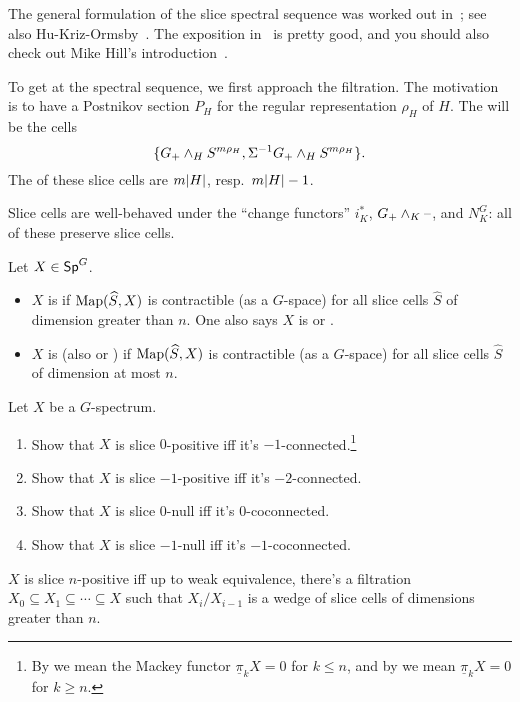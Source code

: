 The general formulation of the slice spectral sequence was worked out in~\cite{HHR}; see also
Hu-Kriz-Ormsby~\cite{HKO11}. The exposition in~\cite{HHR} is pretty good, and you should also check out Mike Hill's
introduction~\cite{HillSlice}.

To get at the spectral sequence, we first approach the filtration. The motivation is to have a Postnikov section
$P_H$ for the regular representation $\rho_H$ of $H$. The  will be the cells
\[\{G_+\wedge_H S^{m\rho_H}, \Sigma^{-1}G_+\wedge_H S^{m\rho_H}\}.\]
The  of these slice cells are $m\lvert H\rvert$, resp.\ $m\lvert H\rvert - 1$.

Slice cells are well-behaved under the ``change functors'' $i_K^*$, $G_+\wedge_K\text{--}$, and $N_K^G$: all of these
preserve slice cells.
\begin{defn}
Let $X\in\mathsf{Sp}^G$.
\begin{itemize}
	\item $X$ is  if $\operatorname{Map}(\widehat S, X)$ is contractible (as a $G$-space) for all slice
	cells $\widehat S$ of dimension greater than $n$. One also says $X$ is  or
	.
	\item $X$ is  (also  or ) if $\operatorname{Map}(\widehat S,
	X)$ is contractible (as a $G$-space) for all slice cells $\widehat S$ of dimension at most $n$.
\end{itemize}
\end{defn}
\begin{ex}
Let $X$ be a $G$-spectrum.
\label{slicerecognition}
\begin{enumerate}
	\item Show that $X$ is slice $0$-positive iff it's $-1$-connected.\footnote{By  we mean
	the Mackey functor $\underline\pi_kX = 0$ for $k\le n$, and by  we mean
	$\underline\pi_kX = 0$ for $k\ge n$.}
	\item Show that $X$ is slice $-1$-positive iff it's $-2$-connected.
	\item Show that $X$ is slice $0$-null iff it's $0$-coconnected.
	\item Show that $X$ is slice $-1$-null iff it's $-1$-coconnected.
\end{enumerate}
\end{ex}
\begin{prop}
$X$ is slice $n$-positive iff up to weak equivalence, there's a filtration $X_0\subseteq
X_1\subseteq\dotsb\subseteq X$ such that $X_i/X_{i-1}$ is a wedge of slice cells of dimensions greater than $n$.
\end{prop}

